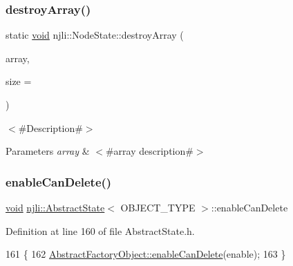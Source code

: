 \subsubsection{\texorpdfstring{destroy\+Array()}{destroyArray()}}
{\footnotesize\ttfamily static \mbox{\hyperlink{_thread_8h_af1e856da2e658414cb2456cb6f7ebc66}{void}} njli\+::\+Node\+State\+::destroy\+Array (\begin{DoxyParamCaption}\item[{\mbox{\hyperlink{classnjli_1_1_node_state}{Node\+State}} $\ast$$\ast$}]{array,  }\item[{const \mbox{\hyperlink{_util_8h_a10e94b422ef0c20dcdec20d31a1f5049}{u32}}}]{size = {} }\end{DoxyParamCaption})\hspace{0.3cm}{\ttfamily [static]}}

$<$\#\+Description\#$>$


\begin{DoxyParams}{Parameters}
{\em array} & $<$\#array description\#$>$ \\
\hline
\end{DoxyParams}
\mbox{\label{classnjli_1_1_node_state_a4ed007508bd8f80af668a302376b7d1a}} 
\subsubsection{\texorpdfstring{enable\+Can\+Delete()}{enableCanDelete()}}
{\footnotesize\ttfamily \mbox{\hyperlink{_thread_8h_af1e856da2e658414cb2456cb6f7ebc66}{void}} \mbox{\hyperlink{classnjli_1_1_abstract_state}{njli\+::\+Abstract\+State}}$<$ O\+B\+J\+E\+C\+T\+\_\+\+T\+Y\+PE $>$\+::enable\+Can\+Delete}



Definition at line 160 of file Abstract\+State.\+h.


\begin{DoxyCode}
161   \{
162     \mbox{\hyperlink{classnjli_1_1_abstract_factory_object_a678b8f28320f6a7e2aa38d5ef72889a8}{AbstractFactoryObject::enableCanDelete}}(enable);
163   \}
\end{DoxyCode}
\mbox{\label{classnjli_1_1_node_state_aa4e66d0016cd5c43dc3a485eaf558174}} 
